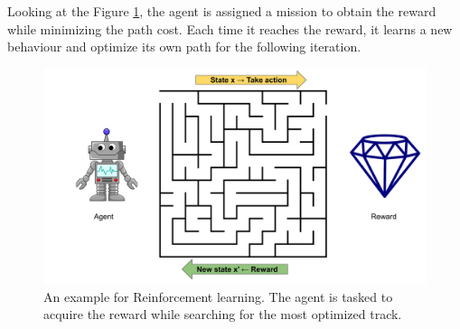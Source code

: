 \begin{itemize}
 Looking at the Figure \ref{fig:reinforcement}, the agent is assigned a mission to obtain the reward while minimizing the path cost. Each time it reaches the reward, it learns a new behaviour and optimize its own path for the following iteration. 
 
\begin{figure}[!h]
    \centering
    \includegraphics[width=\textwidth]{content/resources/new_images/related_works/reinforcement.pdf}
    \caption{An example for Reinforcement learning. The agent is tasked to acquire the reward while searching for the most optimized track.}
    \label{fig:reinforcement}
\end{figure}
 
 \end{itemize}



